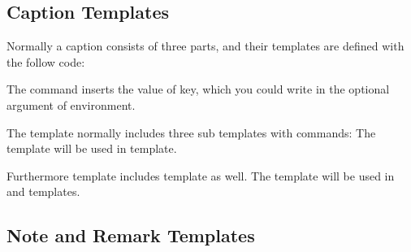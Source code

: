 \documentclass[oneside]{book}
\begin{document}
\begin{codehigh}
\end{codehigh}

\subsection{Caption Templates}

Normally a caption consists of three parts, and their templates are defined with the follow code:

\begin{codehigh}
\end{codehigh}

The command  inserts the value of  key,
which you could write in the optional argument of  environment.

The  template normally includes three sub templates with \CC{\UseTblrTemplate} commands:
The  template will be used in  template.

\begin{codehigh}
\end{codehigh}

Furthermore  template includes  template as well.
The  template will be used in  and  templates.

\begin{codehigh}
\end{codehigh}

\subsection{Note and Remark Templates}
\end{document}
